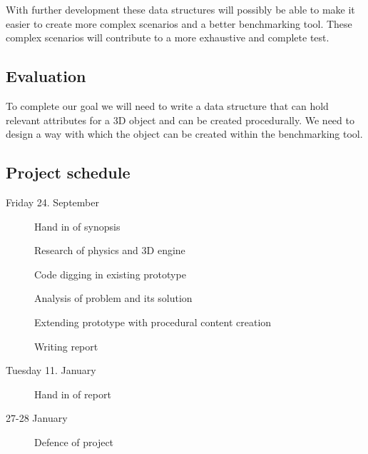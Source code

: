 \documentclass[a4paper, 10pt]{article}
\begin{document}
With further development these data structures will possibly be able to make it easier to create more complex scenarios
and a better benchmarking tool. These complex scenarios will contribute to a more exhaustive and complete test.
\subsection*{Evaluation}
To complete our goal we will need to write a data structure that can hold relevant attributes for a 3D object and can be
created procedurally. We need to design a way with which the object can be created within the benchmarking tool.
\subsection*{Project schedule}
\begin{description}
\item[Friday 24. September] Hand in of synopsis
\item[]Research of physics and 3D engine
\item[]Code digging in existing prototype
\item[]Analysis of problem and its solution
\item[]Extending prototype with procedural content creation
\item[]Writing report
\item[Tuesday 11. January] Hand in of report
\item[27-28 January] Defence of project
\end{description}
\end{document}
